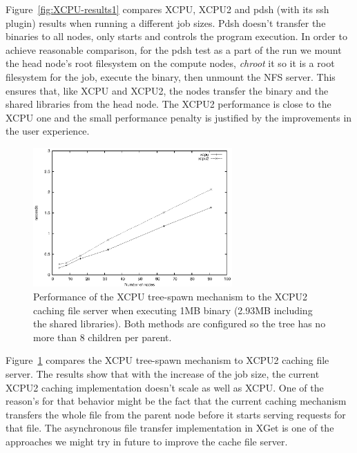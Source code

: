 \documentclass[10pt,conference,letterpaper]{IEEEtran}
\begin{document}
Figure~\ref{fig:XCPU-results1} compares XCPU, XCPU2 and pdsh (with its ssh
plugin) results when running a different job sizes. Pdsh doesn't transfer
the binaries to all nodes, only starts and controls the program execution.
In order to achieve reasonable comparison, for the pdsh test as a part of
the run we mount the head node's root filesystem on the compute nodes,
\textsl{chroot} it so it is a root filesystem for the job, execute the
binary, then unmount the NFS server. This ensures that, like XCPU and XCPU2,
the nodes transfer the binary and the shared libraries from the head node.
The XCPU2 performance is close to the XCPU one and the small performance
penalty is justified by the improvements in the user experience.

\begin{figure}[h]
\begin{center}
\includegraphics[width=3in, keepaspectratio]{results2.eps}
\end{center}
\caption{Performance of the XCPU tree-spawn mechanism to the XCPU2 caching
file server when executing 1MB binary (2.93MB including the shared
libraries). Both methods are configured so the tree has no more than 8
children per parent.}
\label{fig:XCPU-results2}
\end{figure}

Figure~\ref{fig:XCPU-results2} compares the XCPU tree-spawn mechanism to
XCPU2 caching file server. The results show that with the increase of the
job size, the current XCPU2 caching implementation doesn't scale as well as
XCPU. One of the reason's for that behavior might be the fact that the
current caching mechanism transfers the whole file from the parent node
before it starts serving requests for that file. The asynchronous
file transfer implementation in XGet is one of the approaches we might try
in future to improve the cache file server.
\end{document}
